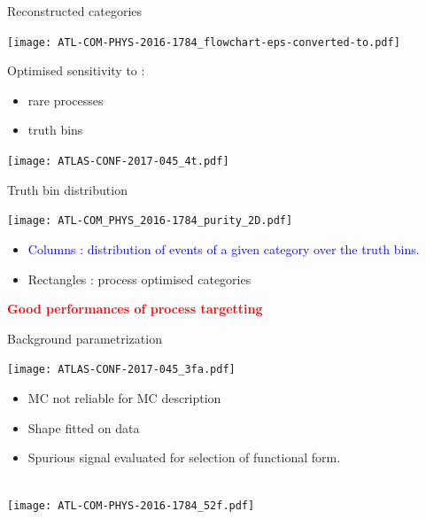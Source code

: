 \begin{frame}{Reconstructed categories}
  \begin{minipage}{0.49\linewidth}
      \texttt{[image: ATL-COM-PHYS-2016-1784\_flowchart-eps-converted-to.pdf]}
  \end{minipage}
  \hfill
  \begin{minipage}{0.49\linewidth}
    Optimised sensitivity to :
    \begin{itemize}
    \item rare processes
    \item truth bins
    \end{itemize}
    \texttt{[image: ATLAS-CONF-2017-045\_4t.pdf]}
  \end{minipage}
\end{frame}
\begin{frame}{Truth bin distribution}
  \begin{minipage}{0.6\linewidth}
      \texttt{[image: ATL-COM\_PHYS\_2016-1784\_purity\_2D.pdf]}
  \end{minipage}
  \hfill
  \begin{minipage}{0.39\linewidth}
    \begin{itemize}
    \item \textcolor{blue}{Columns : distribution of events of a given category over the truth bins.}
    \item Rectangles : process optimised categories
    \end{itemize}
  \end{minipage}
  
  \centering
  \textcolor{red}{\bf Good performances of process targetting}
\end{frame}
\begin{frame}{Background parametrization}
  \begin{minipage}{0.45\linewidth}
    \texttt{[image: ATLAS-CONF-2017-045\_3fa.pdf]}
  \end{minipage}
  \hfill
  \begin{minipage}{0.45\linewidth}
    \begin{itemize}
    \item MC not reliable for MC description
    \item Shape fitted on data
    \item Spurious signal evaluated for selection of functional form.
    \end{itemize}
  \end{minipage}\\
  \texttt{[image: ATL-COM-PHYS-2016-1784\_52f.pdf]}
\end{frame}
